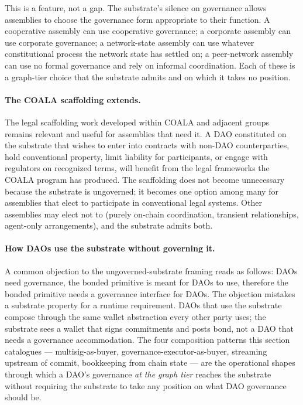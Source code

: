 \documentclass[11pt,a4paper]{article}
\theoremstyle{remark}
\begin{document}
This is a feature, not a gap. The substrate's silence on
governance allows assemblies to choose the governance form
appropriate to their function. A cooperative assembly can use
cooperative governance; a corporate assembly can use corporate
governance; a network-state assembly can use whatever
constitutional process the network state has settled on; a
peer-network assembly can use no formal governance and rely on
informal coordination. Each of these is a graph-tier choice
that the substrate admits and on which it takes no position.

\paragraph{The COALA scaffolding extends.}
The legal scaffolding work developed within COALA and adjacent
groups remains relevant and useful for assemblies that need it.
A DAO constituted on the substrate that wishes to enter into
contracts with non-DAO counterparties, hold conventional
property, limit liability for participants, or engage with
regulators on recognized terms, will benefit from the legal
frameworks the COALA program has produced. The scaffolding does
not become unnecessary because the substrate is ungoverned; it
becomes one option among many for assemblies that elect to
participate in conventional legal systems. Other assemblies may
elect not to (purely on-chain coordination, transient
relationships, agent-only arrangements), and the substrate
admits both.

\paragraph{How DAOs use the substrate without governing it.}
A common objection to the ungoverned-substrate framing reads as
follows: DAOs need governance, the bonded primitive is meant for
DAOs to use, therefore the bonded primitive needs a governance
interface for DAOs. The objection mistakes a substrate property
for a runtime requirement. DAOs that use the substrate compose
through the same wallet abstraction every other party uses; the
substrate sees a wallet that signs commitments and posts bond,
not a DAO that needs a governance accommodation. The four
composition patterns this section catalogues ---
multisig-as-buyer, governance-executor-as-buyer, streaming
upstream of commit, bookkeeping from chain state --- are the
operational shapes through which a DAO's governance \emph{at the
graph tier} reaches the substrate without requiring the substrate
to take any position on what DAO governance should be.
\end{document}
